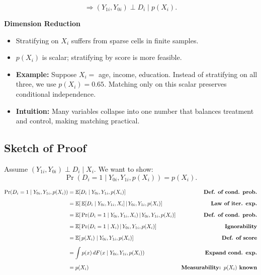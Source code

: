 \documentclass[12pt]{article}
\begin{document}
\[
\Rightarrow (Y_{1i}, Y_{0i}) \perp D_i \mid p(X_i).
\]

\textbf{Dimension Reduction}  
\begin{itemize}
    \item Stratifying on $X_i$ suffers from sparse cells in finite samples.  
    \item $p(X_i)$ is scalar; stratifying by score is more feasible.  
\end{itemize}

\begin{itemize}
    \item \textbf{Example:} Suppose $X_i=$ age, income, education. Instead of stratifying on all three, we use $p(X_i)=0.65$. Matching only on this scalar preserves conditional independence.  
    \item \textbf{Intuition:} Many variables collapse into one number that balances treatment and control, making matching practical.  
\end{itemize}

\subsection*{\noindent\textbf{Sketch of Proof}}

Assume $(Y_{1i}, Y_{0i}) \perp D_i \mid X_i$.  
We want to show:
\[
\Pr(D_i=1 \mid Y_{0i}, Y_{1i}, p(X_i)) = p(X_i).
\]

\singlespacing
\begin{align}
\Pr(D_i=1 \mid Y_{0i}, Y_{1i}, p(X_i)) 
   &= \mathbb{E}[D_i \mid Y_{0i}, Y_{1i}, p(X_i)] 
   & \text{\textbf{Def. of cond. prob.}} \\[6pt]
   &= \mathbb{E}\!\left[\, \mathbb{E}[D_i \mid Y_{0i}, Y_{1i}, X_i] \,\middle|\, Y_{0i}, Y_{1i}, p(X_i)\right] 
   & \text{\textbf{Law of iter. exp.}} \\[6pt]
   &= \mathbb{E}\!\left[\, \Pr(D_i=1 \mid Y_{0i}, Y_{1i}, X_i) \,\middle|\, Y_{0i}, Y_{1i}, p(X_i)\right] 
   & \text{\textbf{Def. of cond. prob.}} \\[6pt]
   &= \mathbb{E}\!\left[\, \Pr(D_i=1 \mid X_i) \,\middle|\, Y_{0i}, Y_{1i}, p(X_i)\right] 
   & \text{\textbf{Ignorability}} \\[6pt]
   &= \mathbb{E}[\, p(X_i) \mid Y_{0i}, Y_{1i}, p(X_i)] 
   & \text{\textbf{Def. of score}} \\[6pt]
   &= \int p(x)\, dF(x \mid Y_{0i}, Y_{1i}, p(X_i)) 
   & \text{\textbf{Expand cond. exp.}} \\[6pt]
   &= p(X_i) 
   & \text{\textbf{Measurability: $p(X_i)$ known}} 
\end{align}
\end{document}
